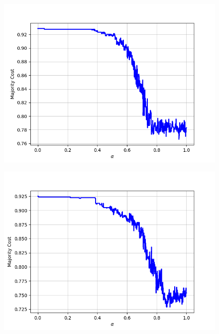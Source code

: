 \begin{figure}[H]
\begin{minipage}{.24\textwidth}
  {\includegraphics[width=\linewidth]{plots/omniglot-intra-sc/Japanese_(hiragana)}}
\end{minipage}
\begin{minipage}{.24\textwidth}
  \centering
  {\includegraphics[width=\linewidth]{plots/omniglot-intra-sc/Japanese_(katakana)}}
\end{minipage}
\end{figure}
